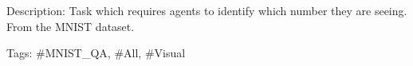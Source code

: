 Description\+: Task which requires agents to identify which number they are seeing. From the M\+N\+I\+ST dataset.

Tags\+: \#\+M\+N\+I\+S\+T\+\_\+\+QA, \#\+All, \#\+Visual 